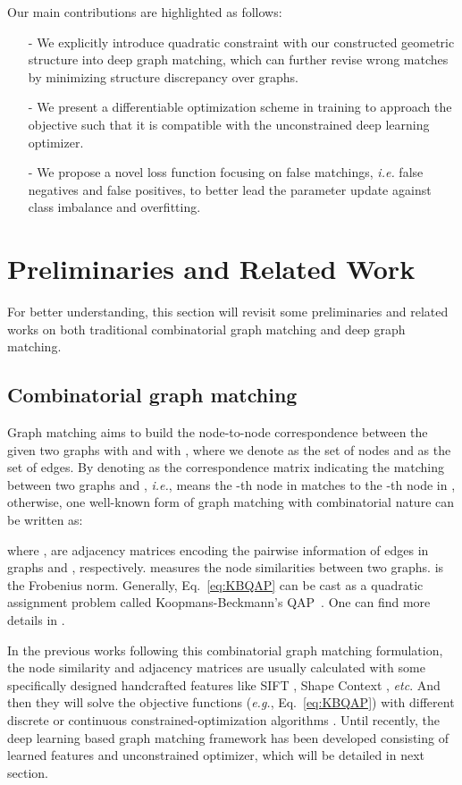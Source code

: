 \documentclass[final]{cvpr}
\begin{document}
Our main contributions are highlighted as follows:
\begin{itemize}
    \item[-] We explicitly introduce quadratic constraint with our constructed geometric structure into deep graph matching, which can further revise wrong matches by minimizing structure discrepancy over graphs.
    \item[-] We present a differentiable optimization scheme in training to approach the objective such that it is compatible with the unconstrained deep learning optimizer.
    \item[-] We propose a novel loss function focusing on false matchings, {\em i.e.} false negatives and false positives, to better lead the parameter update against class imbalance and overfitting.
\end{itemize}

\section{Preliminaries and Related Work}
For better understanding, this section will revisit some preliminaries and related works on both traditional combinatorial graph matching and deep graph matching.

\subsection{Combinatorial graph matching}
Graph matching aims to build the node-to-node correspondence between the given two graphs  with  and  with , where  we denote as the set of nodes and  as the set of edges. By denoting  as the correspondence matrix indicating the matching between two graphs  and , {\em i.e.},  means the -th node in  matches to the -th node in ,  otherwise, one well-known form of graph matching with combinatorial nature can be written as:

where ,  are adjacency matrices encoding the pairwise information of edges in graphs  and , respectively.  measures the node similarities between two graphs.  is the Frobenius norm. Generally, Eq.~\eqref{eq:KBQAP} can be cast as a quadratic assignment problem called Koopmans-Beckmann's QAP~\cite{loiola2007survey}. One can find more details in \cite{yan2016short}.

In the previous works \cite{gold1996graduated,wfd2020frgm,zhou2015factorized} following this combinatorial graph matching formulation, the node similarity  and adjacency matrices  are usually calculated with some specifically designed handcrafted features like SIFT \cite{lowe2004distinctive}, Shape Context \cite{belongie2002shape}, {\em etc}. And then they will solve the objective functions ({\em e.g.}, Eq.~\eqref{eq:KBQAP}) with different discrete or continuous constrained-optimization algorithms \cite{cho2014finding,wfd2020frgm,egozi2012probabilistic,yan2015discrete}. Until recently, the deep learning based graph matching framework has been developed
consisting of learned features and unconstrained optimizer, which will be detailed in next section.
\end{document}

